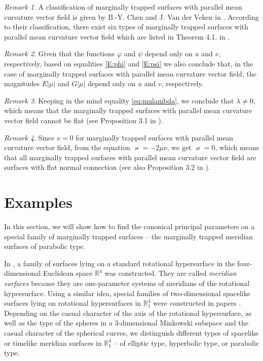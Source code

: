\documentclass[12pt]{amsart}
\newcommand{\R}{\mathbb R}
\theoremstyle{definition}
\theoremstyle{remark}
\newtheorem{remark}{Remark}[section]
\numberwithin{equation}{section}
\begin{document}
\begin{remark}
A classification of marginally trapped surfaces with parallel mean curvature vector field is given by B.-Y. Chen and J. Van der Veken in \cite{Chen-Veken-2}. According to their classification, there exist six types of marginally trapped surfaces with parallel mean curvature vector field which are listed in Theorem 4.1. in  \cite{Chen-Veken-2}.
\end{remark}


\begin{remark}
	Given that  the functions $\varphi$ and $\psi$ depend only on $u$ and $v$, respectively, based on equalities \eqref{E:phi} and \eqref{E:psi} we also conclude that, in the case of marginally trapped surfaces with parallel mean curvature vector field, the magnitudes $E|\mu|$ and $G|\mu|$ depend only on $u$ and $v$, respectively.
\end{remark}

\begin{remark}
  Keeping in the mind equality \eqref{eq:mulambda}, we conclude that $\lambda\ne0$, which means that the marginally trapped surfaces with parallel mean curvature vector field cannot be flat (see Proposition 3.1 in \cite{G-M-JMP-2012}).
\end{remark}

\begin{remark}
Since  $\nu=0$ for marginally trapped surfaces with parallel mean curvature vector field, from the equation $\varkappa=-2\mu\nu$, we get $\varkappa=0$, which means that all marginally trapped surfaces with parallel mean curvature vector field are surfaces with flat normal connection (see also Proposition 3.2 in \cite{G-M-JMP-2012}).
\end{remark}


\section{Examples }

In this section, we will show how to find the canonical principal parameters on a special family of marginally trapped surfaces -- the marginally trapped meridian surfaces of parabolic type.


In \cite{GM4}, a family of surfaces lying on a standard rotational hypersurface in the four-dimensional Euclidean space
$\R^4$ was constructed.  
They are called \emph{meridian surfaces} because they are one-parameter systems of meridians of the rotational hypersurface. Using a similar idea,  special families of two-dimensional spacelike surfaces lying
on rotational hypersurfaces in $\R^4_1$ were constructed in papers \cite{G-M-JMP-2012,G-M-IJGMMP-2013}. Depending on the casual character of the axis of the rotational hypersurface, as well as the type of the spheres in
a 3-dimensional Minkowski subspace and the casual character of the spherical curves, we
distinguish different types of spacelike or timelike  meridian surfaces  in $\R^4_1$ -- of elliptic type, hyperbolic type, or parabolic type.
\end{document}
